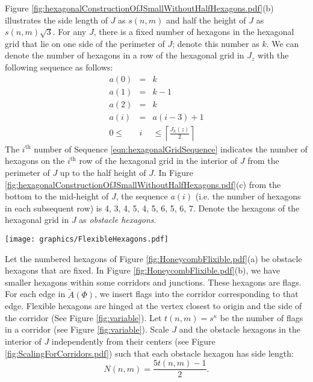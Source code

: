 \documentclass[10pt]{CSUNthesis}
\theoremstyle{plain}%
\theoremstyle{definition}
\theoremstyle{remark}
\newcommand{\ceil}[1]{\left\lceil #1 \right\rceil}
\begin{document}
Figure \ref{fig:hexagonalConstructionOfJSmallWithoutHalfHexagons.pdf}(b) illustrates the side length of $J$ as $s(n,m)$ and half the height of $J$ as $s(n,m) \sqrt{3}$.
For any $J$, there is a fixed number of hexagons in the hexagonal grid that lie on one side of the perimeter of $J$; denote this number as $k$.
We can denote the number of hexagons in a row of the hexagonal grid in $J_z$ with the following sequence as follows:
\begin{equation}\label{eqn:hexagonalGridSequence}
\begin{array}{rcl}
a(0) &=& k\\
a(1) &=& k-1 \\
a(2) &=& k\\
a(i) &=& a(i-3)+1\\
0\leq&i&\leq \ceil{\frac{J_h (z)}{2}}
\end{array}
\end{equation}
The $i^\text{th}$ number of Sequence \ref{eqn:hexagonalGridSequence} indicates the number of hexagons on the $i^\text{th}$ row of the hexagonal grid in the interior of $J$ from the perimeter of $J$ up to the half height of $J$. In Figure \ref{fig:hexagonalConstructionOfJSmallWithoutHalfHexagons.pdf}(c) from the bottom to the mid-height of $J$, the sequence $a(i)$ (i.e. the number of hexagons in each subsequent row) is 4, 3, 4, 5, 4, 5, 6, 5, 6, 7.
Denote the hexagons of the hexagonal grid in $J$ as \textit{obstacle hexagons}.

\begin{minipage}{\linewidth}
\begin{center}
\texttt{[image: graphics/FlexibleHexagons.pdf]}
\label{fig:HoneycombFlixible.pdf}
\end{center}
\end{minipage}

Let the numbered hexagons of Figure \ref{fig:HoneycombFlixible.pdf}(a) be obstacle hexagons that are fixed.
In Figure \ref{fig:HoneycombFlixible.pdf}(b), we have smaller hexagons within some corridors and junctions.
These hexagons are flags.
For each edge in $\tilde{A}(\Phi)$, we insert flags into the corridor corresponding to that edge.
Flexible hexagons are hinged at the vertex closest to origin and the side of the corridor (See Figure \ref{fig:variable}).
Let $t(n,m)=s^\kappa$ be the number of flags in a corridor (see Figure \ref{fig:variable}). 
Scale $J$ and the obstacle hexagons in the interior of $J$ independently from their centers (see Figure \ref{fig:ScalingForCorridors.pdf}) such that each obstacle hexagon has side length: $$N(n,m)=\frac{5t(n,m)-1}{2}.$$ 
\end{document}
